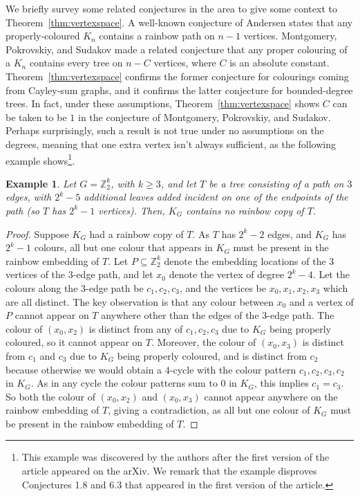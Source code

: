 \documentclass[a4paper,11pt,hidelinks]{amsart}
\newtheorem{example}[theorem]{Example}
\theoremstyle{definition}
\begin{document}
\par We briefly survey some related conjectures in the area to give some context to Theorem~\ref{thm:vertexspace}. A well-known conjecture of Andersen \cite{andersen1989hamilton, alon2017random} states that any properly-coloured $K_n$ contains a rainbow path on $n-1$ vertices. Montgomery, Pokrovskiy, and Sudakov \cite[Conjecture 11.1]{approximateringel} made a related conjecture that any proper colouring of a $K_n$ contains every tree on $n-C$ vertices, where $C$ is an absolute constant. Theorem~\ref{thm:vertexspace} confirms the former conjecture for colourings coming from Cayley-sum graphs, and it confirms the latter conjecture for bounded-degree trees. In fact, under these assumptions, Theorem~\ref{thm:vertexspace} shows $C$ can be taken to be $1$ in the conjecture of Montgomery, Pokrovskiy, and Sudakov. Perhaps surprisingly, such a result is not true under no assumptions on the degrees, meaning that one extra vertex isn't always sufficient, as the following example shows\footnote{This example was discovered by the authors after the first version of the article appeared on the arXiv. We remark that the example disproves Conjectures 1.8 and 6.3 that appeared in the first version of the article.}. 
\begin{example}\label{ex:new}
    Let $G=\mathbb{Z}_2^k$, with $k\geq 3$, and let $T$ be a tree consisting of a path on $3$ edges, with $2^k-5$ additional leaves added incident on one of the endpoints of the path (so $T$ has $2^k-1$ vertices). Then, $K_G$ contains no rainbow copy of $T$. 
\end{example}
\begin{proof}
    Suppose $K_G$ had a rainbow copy of $T$. As $T$ has $2^k-2$ edges, and $K_G$ has $2^k-1$ colours, all but one colour that appears in $K_G$ must be present in the rainbow embedding of $T$. Let $P\subseteq \mathbb{Z}_2^k$ denote the embedding locations of the $3$ vertices of the $3$-edge path, and let $x_0$ denote the vertex of degree $2^k-4$. Let the colours along the $3$-edge path be $c_1,c_2,c_3$, and the vertices be $x_0,x_1,x_2,x_3$ which are all distinct. The key observation is that any colour between $x_0$ and a vertex of $P$ cannot appear on $T$ anywhere other than the edges of the $3$-edge path. The colour of $(x_0,x_2)$ is distinct from any of $c_1,c_2,c_3$ due to $K_G$ being properly coloured, so it cannot appear on $T$. Moreover, the colour of $(x_0,x_3)$ is distinct from $c_1$ and $c_3$ due to $K_G$ being properly coloured, and is distinct from $c_2$ because otherwise we would obtain a $4$-cycle with the colour pattern $c_1,c_2,c_3,c_2$ in $K_G$. As in any cycle the colour patterns sum to $0$ in $K_G$, this implies $c_1=c_3$. So both the colour of $(x_0,x_2)$ and $(x_0,x_3)$ cannot appear anywhere on the rainbow embedding of $T$, giving a contradiction, as all but one colour of $K_G$ must be present in the rainbow embedding of $T$.
\end{proof}
\end{document}
